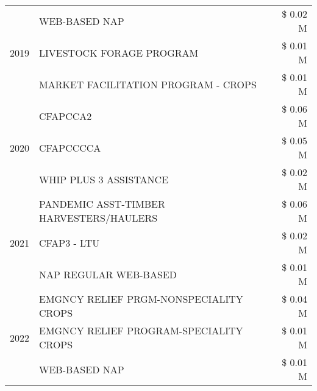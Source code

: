 \begin{tabular}{llr}
\cline{1-3}
\multirow[t]{3}{*}{2019} & WEB-BASED NAP & \$ 0.02 M \\
 & LIVESTOCK FORAGE PROGRAM & \$ 0.01 M \\
 & MARKET FACILITATION PROGRAM - CROPS & \$ 0.01 M \\
\cline{1-3}
\multirow[t]{3}{*}{2020} & CFAPCCA2 & \$ 0.06 M \\
 & CFAPCCCCA & \$ 0.05 M \\
 & WHIP PLUS 3 ASSISTANCE & \$ 0.02 M \\
\cline{1-3}
\multirow[t]{3}{*}{2021} & PANDEMIC ASST-TIMBER HARVESTERS/HAULERS & \$ 0.06 M \\
 & CFAP3 - LTU & \$ 0.02 M \\
 & NAP REGULAR WEB-BASED & \$ 0.01 M \\
\cline{1-3}
\multirow[t]{3}{*}{2022} & EMGNCY RELIEF PRGM-NONSPECIALITY CROPS & \$ 0.04 M \\
 & EMGNCY RELIEF PROGRAM-SPECIALITY CROPS & \$ 0.01 M \\
 & WEB-BASED NAP & \$ 0.01 M \\
\cline{1-3}
\bottomrule
\end{tabular}
